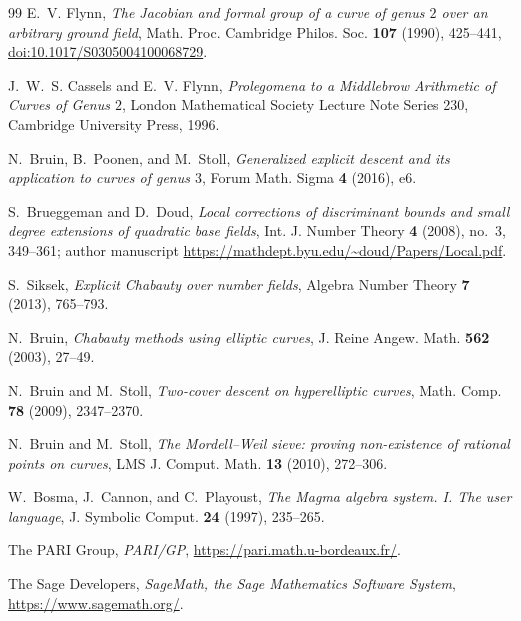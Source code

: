 \documentclass[11pt]{article}
\theoremstyle{definition}
\theoremstyle{remark}
\begin{document}
\begin{thebibliography}{99}
E.~V. Flynn,
\emph{The Jacobian and formal group of a curve of genus $2$ over an
arbitrary ground field},
Math. Proc. Cambridge Philos. Soc. \textbf{107} (1990), 425--441,
\href{https://doi.org/10.1017/S0305004100068729}
     {doi:10.1017/S0305004100068729}.

J.~W.~S. Cassels and E.~V. Flynn,
\emph{Prolegomena to a Middlebrow Arithmetic of Curves of Genus $2$},
London Mathematical Society Lecture Note Series 230,
Cambridge University Press, 1996.

N.~Bruin, B.~Poonen, and M.~Stoll,
\emph{Generalized explicit descent and its application to curves of genus
$3$}, Forum Math. Sigma \textbf{4} (2016), e6.

S.~Brueggeman and D.~Doud,
\emph{Local corrections of discriminant bounds and small degree extensions
of quadratic base fields},
Int. J. Number Theory \textbf{4} (2008), no.~3, 349--361;
author manuscript \url{https://mathdept.byu.edu/~doud/Papers/Local.pdf}.

S.~Siksek,
\emph{Explicit Chabauty over number fields},
Algebra Number Theory \textbf{7} (2013), 765--793.

N.~Bruin,
\emph{Chabauty methods using elliptic curves},
J. Reine Angew. Math. \textbf{562} (2003), 27--49.

N.~Bruin and M.~Stoll,
\emph{Two-cover descent on hyperelliptic curves},
Math. Comp. \textbf{78} (2009), 2347--2370.

N.~Bruin and M.~Stoll,
\emph{The Mordell--Weil sieve: proving non-existence of rational points on
curves},
LMS J. Comput. Math. \textbf{13} (2010), 272--306.

W.~Bosma, J.~Cannon, and C.~Playoust,
\emph{The Magma algebra system. I. The user language},
J. Symbolic Comput. \textbf{24} (1997), 235--265.

The PARI Group,
\emph{PARI/GP},
\url{https://pari.math.u-bordeaux.fr/}.

The Sage Developers,
\emph{SageMath, the Sage Mathematics Software System},
\url{https://www.sagemath.org/}.

\end{thebibliography}
\normalsize
\end{document}
